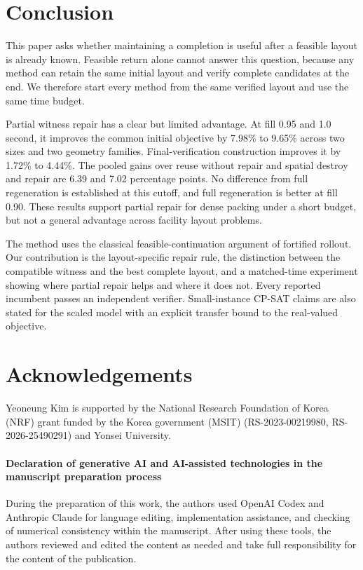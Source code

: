 \documentclass[preprint,12pt,authoryear]{elsarticle}
\begin{document}
\section{Conclusion}
\label{sec:conclusion}

This paper asks whether maintaining a completion is useful after a feasible
layout is already known. Feasible return alone cannot answer this question,
because any method can retain the same initial layout and verify complete
candidates at the end. We therefore start every method from the same verified
layout and use the same time budget.

Partial witness repair has a clear but limited advantage. At fill 0.95 and 1.0
second, it improves the common initial objective by 7.98\% to 9.65\% across two
sizes and two geometry families. Final-verification construction improves it by
1.72\% to 4.44\%. The pooled gains over reuse without repair and spatial destroy
and repair are 6.39 and 7.02 percentage points. No difference from full
regeneration is established at this cutoff, and full regeneration is better at
fill 0.90. These results support partial repair for dense packing under a short
budget, but not a general advantage across facility layout problems.

The method uses the classical feasible-continuation argument of fortified
rollout. Our contribution is the layout-specific repair rule, the distinction
between the compatible witness and the best complete layout, and a matched-time
experiment showing where partial repair helps and where it does not. Every reported
incumbent passes an independent verifier. Small-instance CP-SAT claims are also
stated for the scaled model with an explicit transfer bound to the real-valued
objective.

\section*{Acknowledgements}
Yeoneung Kim is supported by the National Research Foundation of Korea (NRF)
grant funded by the Korea government (MSIT) (RS-2023-00219980,
RS-2026-25490291) and Yonsei University.

\paragraph{Declaration of generative AI and AI-assisted technologies in the
manuscript preparation process}
During the preparation of this work, the authors used OpenAI Codex and Anthropic
Claude for language editing, implementation assistance, and checking of
numerical consistency within the manuscript. After using these tools, the
authors reviewed and edited the content as needed and take full responsibility
for the content of the publication.
\end{document}
